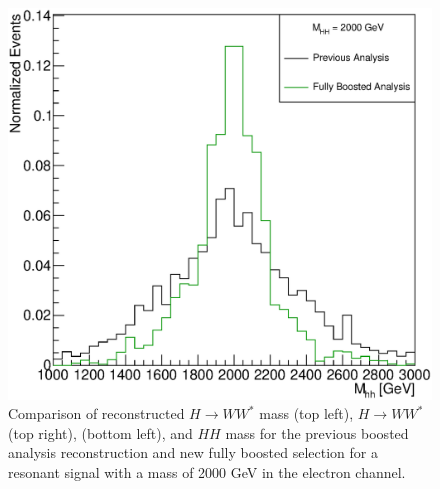 \begin{figure}[h]
\begin{center}
\includegraphics[scale=0.25]{figures/WHad_plots_john_withcuts/electron/hh_m_Xhh2000}
\caption[Comparison of ${H\rightarrow WW^{*}}$ mass, ${H\rightarrow WW^{*}}$ \pt, \met , and $HH$ mass for the electron channel]{Comparison of reconstructed ${H\rightarrow WW^{*}}$ mass (top left), ${H\rightarrow WW^{*}}$ \pt (top right), \met (bottom left), and $HH$ mass for the  previous boosted analysis reconstruction and new fully boosted selection for a resonant signal with a mass of 2000 GeV in the electron channel.}
\label{fig:elec_sel}
\end{center}
\end{figure}

\newpage

